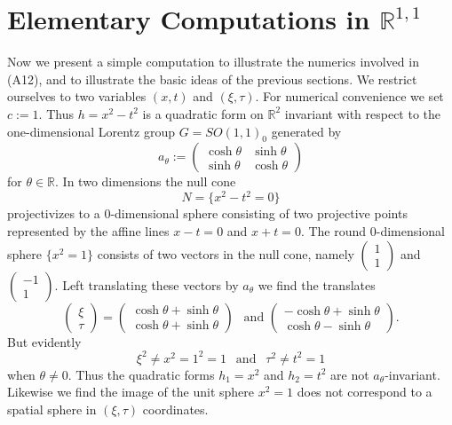 \documentclass[12pt]{article}
\newcommand{\bR}{\mathbb{R}}
\begin{document}

\section{Elementary Computations in ${\bR}^{1,1}$}\label{compute}

Now we present a simple computation to illustrate the numerics involved in (A12), and to illustrate the basic ideas of the previous sections. We restrict ourselves to two variables $(x,t)$ and $(\xi, \tau)$. For numerical convenience we set $c:=1$. Thus $h=x^2-t^2$ is a quadratic form on $\bR^2$ invariant with respect to the one-dimensional Lorentz group $G=SO(1,1)_0$ generated by $$a_\theta:=\begin{pmatrix} \cosh \theta & \sinh \theta \\
\sinh \theta & \cosh \theta
\end{pmatrix}$$ for $\theta\in \bR$. In two dimensions the null cone $$N=\{x^2-t^2=0\}$$ projectivizes to a $0$-dimensional sphere consisting of two projective points represented by the affine lines $x-t=0$ and $x+t=0$. The round $0$-dimensional sphere $\{x^2=1\}$ consists of two vectors in the null cone, namely $\begin{pmatrix} 1 \\ 1\end{pmatrix}$ and $\begin{pmatrix} -1 \\ 1\end{pmatrix}.$ Left translating these vectors by $a_\theta$ we find the translates $$\begin{pmatrix} \xi \\ \tau \end{pmatrix}=\begin{pmatrix} \cosh \theta+\sinh \theta \\ \cosh \theta+\sinh \theta \end{pmatrix}~~\text{~and~} \begin{pmatrix} -\cosh \theta+\sinh \theta \\ \cosh \theta-\sinh \theta \end{pmatrix}.$$ But evidently $$\xi^2 \neq x^2=1^2=1 ~~\text{~and~}~~ \tau^2 \neq t^2=1$$ when $\theta\neq 0$. Thus the quadratic forms $h_1=x^2$ and $h_2=t^2$ are not $a_\theta$-invariant. Likewise we find the image of the unit sphere $x^2=1$ does not correspond to a spatial sphere in $(\xi, \tau)$ coordinates. 
\end{document}
